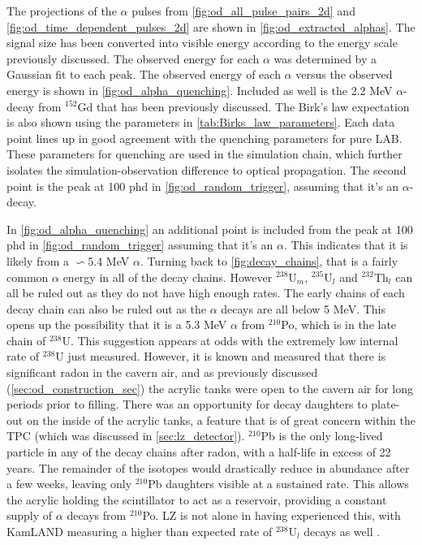 \par
The projections of the $\alpha$ pulses from \autoref{fig:od_all_pulse_pairs_2d} and \autoref{fig:od_time_dependent_pulses_2d} are shown in \autoref{fig:od_extracted_alphas}.
The signal size has been converted into visible energy according to the energy scale previously discussed.
The observed energy for each $\alpha$ was determined by a Gaussian fit to each peak.
The observed energy of each $\alpha$ versus the observed energy is shown in \autoref{fig:od_alpha_quenching}.
Included as well is the 2.2 MeV $\alpha$-decay from ${}^{152}$Gd that has been previously discussed.
The Birk's law expectation is also shown using the parameters in \autoref{tab:Birks_law_parameters}.
Each data point lines up in good agreement with the quenching parameters for pure LAB.
These parameters for quenching are used in the simulation chain, which further isolates the simulation-observation difference to optical propagation.
The second point is the peak at 100 phd in \autoref{fig:od_random_trigger}, assuming that it's an $\alpha$-decay.
\par
In \autoref{fig:od_alpha_quenching} an additional point is included from the peak at 100 phd in \autoref{fig:od_random_trigger} assuming that it's an $\alpha$.
This indicates that it is likely from a $\backsim$5.4 MeV $\alpha$.
Turning back to \autoref{fig:decay_chains}, that is a fairly common $\alpha$ energy in all of the decay chains.
However ${}^{238}$U$_{m}$, ${}^{235}$U$_{l}$ and ${}^{232}$Th$_{l}$ can all be ruled out as they do not have high enough rates.
The early chains of each decay chain can also be ruled out as the $\alpha$ decays are all below 5 MeV.
This opens up the possibility that it is a 5.3 MeV $\alpha$ from ${}^{210}$Po, which is in the late chain of ${}^{238}$U.
This suggestion appears at odds with the extremely low internal rate of ${}^{238}$U just measured.
However, it is known and measured that there is significant radon in the cavern air, and as previously discussed (\autoref{sec:od_construction_sec}) the acrylic tanks were open to the cavern air for long periods prior to filling.
There was an opportunity for decay daughters to plate-out on the inside of the acrylic tanks, a feature that is of great concern within the TPC \cite{radon_plateout_ref} (which was discussed in \autoref{sec:lz_detector}).
${}^{210}$Pb is the only long-lived particle in any of the decay chains after radon, with a half-life in excess of 22 years. 
The remainder of the isotopes would drastically reduce in abundance after a few weeks, leaving only ${}^{210}$Pb daughters visible at a sustained rate.
This allows the acrylic holding the scintillator to act as a reservoir, providing a constant supply of $\alpha$ decays from ${}^{210}$Po.
LZ is not alone in having experienced this, with KamLAND measuring a higher than expected rate of ${}^{238}$U$_l$ decays as well \cite{KamLAND_LS_contaminants_ref}.

